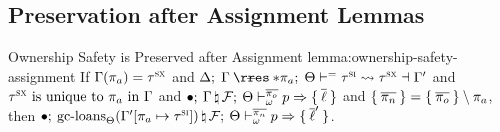 \subsection{Preservation after Assignment Lemmas}
\label{sec:assign-lemmas}

\begin{oxlemma}{Ownership Safety is Preserved after Assignment}
  {lemma:ownership-safety-assignment}
  If $\Gamma(\pi_a) = \tau^\textsc{sx}$ and
  $\oxtunify[\oxnoop]{\oxtvarctx}{\oxkontctx}{
    \oxrsub{\oxvarctx}{\oxderef{\oxplace_a}}
  }{\oxsitype}{\oxsxtype}{\oxvarctx^\prime}$ and
  $\tau^\textsc{sx} \textrm{ is unique to } \pi_a \textrm{ in } \Gamma$ and
  $\bullet; \: 
    \Gamma \, \natural \, \mathcal{F}
  ; \: \Theta \vdash^{\overline{\pi_o}}_{\omega} p \Rightarrow \{ \: \overline{\ell} \: \}$ and
  $\{ \: \overline{\pi_n} \: \} = \{ \: \overline{\pi_o} \: \} \setminus \pi_a$,
  then $\oxmusafetyinner{\oxemptyctx}{\oxkontctx}{
    \oxnewframe{
      \oxgcloans{\oxkontctx}{\oxtupdate{\oxvarctx^\prime}{\oxplace_a}{\oxsitype}}
    }{\oxframe}
  }{\oxmuta}{\overline{\oxplace_n}}{\oxplaceexpr}{\oxset{\oxloans^\prime}}$.
\end{oxlemma}

